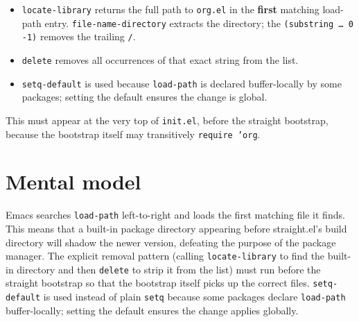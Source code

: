 \begin{itemize}
\item \texttt{locate-library} returns the full path to \texttt{org.el} in the \textbf{first} matching load-path entry. \texttt{file-name-directory} extracts the directory; the \texttt{(substring … 0 -1)} removes the trailing \texttt{/}.
\item \texttt{delete} removes all occurrences of that exact string from the list.
\item \texttt{setq-default} is used because \texttt{load-path} is declared buffer-locally by some packages; setting the default ensures the change is global.
\end{itemize}

This must appear at the very top of \texttt{init.el}, before the straight bootstrap, because the bootstrap itself may transitively \texttt{require 'org}.

\section{Mental model}
Emacs searches \texttt{load-path} left-to-right and loads the first matching
file it finds.  This means that a built-in package directory appearing before
straight.el's build directory will shadow the newer version, defeating the
purpose of the package manager.  The explicit removal pattern (calling
\texttt{locate-library} to find the built-in directory and then
\texttt{delete} to strip it from the list) must run before the straight
bootstrap so that the bootstrap itself picks up the correct files.
\texttt{setq-default} is used instead of plain \texttt{setq} because some
packages declare \texttt{load-path} buffer-locally; setting the default
ensures the change applies globally.

